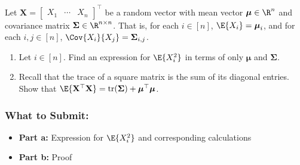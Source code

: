 \documentclass{article}
\begin{document}
\begin{aprob}
    Let $\mathbf{X} = \begin{bmatrix}
        X_1 & \cdots & X_n
    \end{bmatrix}^\top$ be a random vector with mean vector $\boldsymbol{\mu} \in \R^n$ and covariance matrix $\boldsymbol\Sigma \in \R^{n \times n}$. That is, for each $i \in [n]$, $\E {X_i} =\boldsymbol\mu_i$, and for each $i,j \in [n]$, $\Cov{X_i}{X_j} = \boldsymbol\Sigma_{i,j}$.
    \begin{enumerate}
        \item {} Let $i \in [n]$. Find an expression for $\E{X_i^2}$ in terms of only $\boldsymbol\mu$ and $\boldsymbol\Sigma$.
        \item {} Recall that the trace of a square matrix is the sum of its diagonal entries. Show that $\E{\mathbf{X}^\top \mathbf{X}} = \mathrm{tr}(\boldsymbol\Sigma) + \boldsymbol\mu^\top\boldsymbol\mu$. \\
    \end{enumerate}

    \subsubsection*{What to Submit:}
    \begin{itemize}
        \item \textbf{Part a:} Expression for $\E{X_i^2}$ and corresponding calculations
        \item \textbf{Part b:} Proof
    \end{itemize}
\end{aprob}
\end{document}
